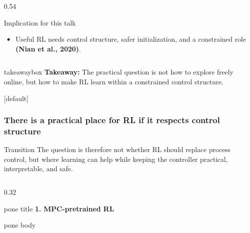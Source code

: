 \documentclass[aspectratio=169]{beamer}
\newcommand{\takeawaybox}[1]{%
\vspace{0.01cm}
\begin{center}
\begin{beamercolorbox}[wd=0.94\textwidth,sep=3pt,center,rounded=true,shadow=false]{takeawaybox}
\scriptsize
\textbf{\textcolor{maroon1}{Takeaway:}} #1
\end{beamercolorbox}
\end{center}
}
\begin{document}
\begin{frame}
\begin{columns}[T,onlytextwidth]
\begin{column}{0.54\textwidth}
\begin{block}{Implication for this talk}
\begin{itemize}
  \item Useful RL needs control structure, safer initialization, and a constrained role
  {\bf \color{maroon1} \scriptsize (Nian et al., 2020)}.
\end{itemize}
\end{block}

\end{column}

\end{columns}

\takeawaybox{The practical question is not how to explore freely online, but how to make RL learn within a constrained control structure.}

\end{frame}

\begin{frame}
[default]
\frametitle{\large \textbf{There is a practical place for RL if it respects control structure}}
\scriptsize

\vspace{-0.23cm}

\begin{block}{Transition}
\justifying
The question is therefore not whether RL should replace process control, but where learning can help while keeping the controller practical, interpretable, and safe.
\end{block}

\vspace{0.02cm}

\begin{columns}[T,onlytextwidth]

\begin{column}{0.32\textwidth}
\begin{beamercolorbox}[wd=\linewidth,ht=3.0ex,dp=1.1ex,center,rounded=true]{pone title}
\scriptsize\textbf{1. MPC-pretrained RL}
\end{beamercolorbox}

\begin{beamercolorbox}[wd=\linewidth,sep=4pt,rounded=true]{pone body}
\begin{minipage}[t][0.45\textheight][t]{0.98\linewidth}
\centering

\end{minipage}
\end{beamercolorbox}
\end{column}
\end{columns}
\end{frame}
\end{document}
